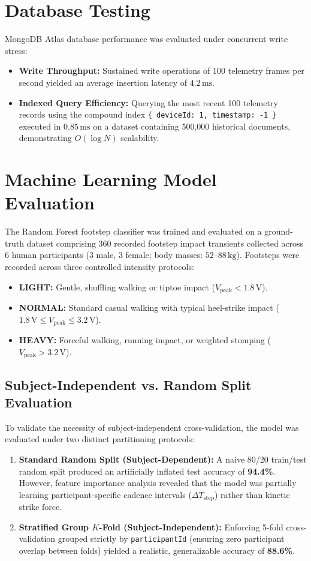 \section{Database Testing}
MongoDB Atlas database performance was evaluated under concurrent write stress:
\begin{itemize}
    \item \textbf{Write Throughput:} Sustained write operations of 100 telemetry frames per second yielded an average insertion latency of $4.2\,\text{ms}$.
    \item \textbf{Indexed Query Efficiency:} Querying the most recent 100 telemetry records using the compound index \texttt{\{ deviceId: 1, timestamp: -1 \}} executed in $0.85\,\text{ms}$ on a dataset containing 500,000 historical documents, demonstrating $O(\log N)$ scalability.
\end{itemize}

\section{Machine Learning Model Evaluation}
The Random Forest footstep classifier was trained and evaluated on a ground-truth dataset comprising 360 recorded footstep impact transients collected across 6 human participants (3 male, 3 female; body masses: $52\text{--}88\,\text{kg}$). Footsteps were recorded across three controlled intensity protocols:
\begin{itemize}
    \item \textbf{LIGHT:} Gentle, shuffling walking or tiptoe impact ($V_{\text{peak}} < 1.8\,\text{V}$).
    \item \textbf{NORMAL:} Standard casual walking with typical heel-strike impact ($1.8\,\text{V} \le V_{\text{peak}} \le 3.2\,\text{V}$).
    \item \textbf{HEAVY:} Forceful walking, running impact, or weighted stomping ($V_{\text{peak}} > 3.2\,\text{V}$).
\end{itemize}

\subsection{Subject-Independent vs. Random Split Evaluation}
To validate the necessity of subject-independent cross-validation, the model was evaluated under two distinct partitioning protocols:
\begin{enumerate}
    \item \textbf{Standard Random Split (Subject-Dependent):} A naive 80/20 train/test random split produced an artificially inflated test accuracy of \textbf{94.4\%}. However, feature importance analysis revealed that the model was partially learning participant-specific cadence intervals ($\Delta T_{\text{step}}$) rather than kinetic strike force.
    \item \textbf{Stratified Group $K$-Fold (Subject-Independent):} Enforcing 5-fold cross-validation grouped strictly by \texttt{participantId} (ensuring zero participant overlap between folds) yielded a realistic, generalizable accuracy of \textbf{88.6\%}.
\end{enumerate}

